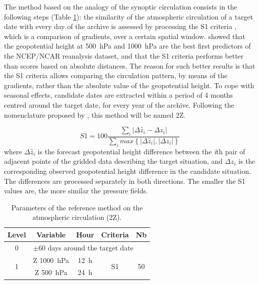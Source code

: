 \documentclass[5p]{elsarticle}
\begin{document}
The method based on the analogy of the synoptic circulation consists in the following steps (Table \ref{table:params_R1}): the similarity of the atmospheric circulation of a target date with every day of the archive is assessed by processing the S1 criteria \citep[Eq.\ (\ref{eq:S1}), ][]{Teweles1954, Drosdowsky2003}, which is a comparison of gradients, over a certain spatial window. \citet{Bontron2005} showed that the geopotential height at 500~hPa and 1000~hPa are the best first predictors of the NCEP/NCAR reanalysis dataset, and that the S1 criteria performs better than scores based on absolute distances. The reason for such better results is that the S1 criteria allows comparing the circulation pattern, by means of the gradients, rather than the absolute value of the geopotential height. To cope with seasonal effects, candidate dates are extracted within a period of 4 months centred around the target date, for every year of the archive. Following the nomenclature proposed by \citet{Horton2016}, this method will be named 2Z.

\begin{equation}
\label{eq:S1}
S1=100 \frac {\displaystyle \sum_{i} \vert \Delta\hat{z}_{i} - \Delta z_{i} \vert}
{\displaystyle \sum_{i} max\left\lbrace \vert \Delta\hat{z}_{i} \vert , \vert \Delta z_{i} \vert \right\rbrace }
\end{equation}
where $\Delta \hat{z}_{i}$ is the forecast geopotential height difference between the \textit{i}th pair of adjacent points of the gridded data describing the target situation, and $\Delta z_{i}$ is the corresponding observed geopotential height difference in the candidate situation. The differences are processed separately in both directions. The smaller the S1 values are, the more similar the pressure fields.

\begin{table}[htbp]
	\caption{Parameters of the reference method on the atmospheric circulation (2Z).}
	\footnotesize
	\begin{center}
		\begin{tabular}{ccccc}
			\hline
			Level & Variable & Hour & Criteria & Nb \\ 
			\hline 
			0 & \multicolumn{4}{l}{$\pm 60$ days around the target date} \\
			\hline 
			\multirow{2}{*}{1} & Z 1000~hPa & 12~h & \multirow{2}{*}{S1} & \multirow{2}{*}{50} \\
			& Z 500~hPa & 24~h & & \\ 
			\hline 
		\end{tabular} 
	\end{center}
	\label{table:params_R1}
\end{table}
\end{document}
